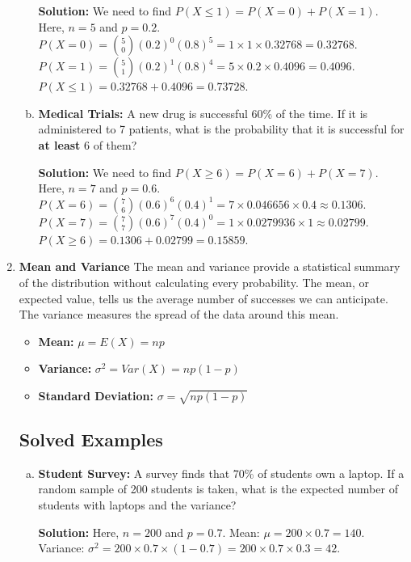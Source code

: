 \documentclass{article}
\begin{document}
\begin{enumerate}
\begin{enumerate}[a)]
        \textbf{Solution:} We need to find $P(X \le 1) = P(X=0) + P(X=1)$. Here, $n=5$ and $p=0.2$.
        $P(X=0) = \binom{5}{0} (0.2)^0 (0.8)^5 = 1 \times 1 \times 0.32768 = 0.32768$.
        $P(X=1) = \binom{5}{1} (0.2)^1 (0.8)^4 = 5 \times 0.2 \times 0.4096 = 0.4096$.
        $P(X \le 1) = 0.32768 + 0.4096 = 0.73728$.
        
        \item \textbf{Medical Trials:} A new drug is successful 60\% of the time. If it is administered to 7 patients, what is the probability that it is successful for \textbf{at least} 6 of them?
        
        \textbf{Solution:} We need to find $P(X \ge 6) = P(X=6) + P(X=7)$. Here, $n=7$ and $p=0.6$.
        $P(X=6) = \binom{7}{6} (0.6)^6 (0.4)^1 = 7 \times 0.046656 \times 0.4 \approx 0.1306$.
        $P(X=7) = \binom{7}{7} (0.6)^7 (0.4)^0 = 1 \times 0.0279936 \times 1 \approx 0.02799$.
        $P(X \ge 6) = 0.1306 + 0.02799 = 0.15859$.
    \end{enumerate}

    \item \textbf{Mean and Variance}
    The mean and variance provide a statistical summary of the distribution without calculating every probability. The mean, or expected value, tells us the average number of successes we can anticipate. The variance measures the spread of the data around this mean.

    \begin{itemize}
        \item \textbf{Mean:} $ \mu = E(X) = np $
        \item \textbf{Variance:} $ \sigma^2 = Var(X) = np(1-p) $
        \item \textbf{Standard Deviation:} $ \sigma = \sqrt{np(1-p)} $
    \end{itemize}

    \subsection*{Solved Examples}
    \begin{enumerate}[a)]
        \item \textbf{Student Survey:} A survey finds that 70\% of students own a laptop. If a random sample of 200 students is taken, what is the expected number of students with laptops and the variance?
        
        \textbf{Solution:} Here, $n=200$ and $p=0.7$.
        Mean: $\mu = 200 \times 0.7 = 140$.
        Variance: $\sigma^2 = 200 \times 0.7 \times (1-0.7) = 200 \times 0.7 \times 0.3 = 42$.
        

\end{enumerate}
\end{enumerate}
\end{document}

